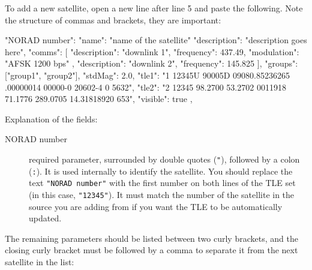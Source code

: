 To add a new satellite, open a new line after line 5 and paste the following.
Note the structure of commas and brackets, they are important:
\begin{configfileScr}
"NORAD number": 
{
  "name": "name of the satellite"
  "description": "description goes here",
  "comms": [
     {
  	"description": "downlink 1",
  	"frequency": 437.49,
  	"modulation": "AFSK 1200 bps"
     },
     {
  	"description": "downlink 2",
  	"frequency": 145.825
     }
  ],
  "groups": ["group1", "group2"],
  "stdMag": 2.0,
  "tle1": "1 12345U 90005D   09080.85236265  .00000014  00000-0  20602-4 0  5632",
  "tle2": "2 12345 98.2700  53.2702 0011918  71.1776 289.0705 14.31818920   653",
  "visible": true
},
\end{configfileScr}
Explanation of the fields:

\begin{description}
\item[NORAD number]  required parameter, surrounded by double quotes (\texttt{"}),
followed by a colon (\texttt{:}). It is used internally to identify the
satellite. You should replace the text \texttt{"NORAD number"} with the first number
on both lines of the TLE set (in this case, \texttt{"12345"}).
It must match the number of the satellite in the source you are adding from if you want the TLE to be automatically updated.
\end{description}
The remaining parameters should be listed between two curly brackets,
and the closing curly bracket must be followed by a comma to separate it from the next satellite in the list:

